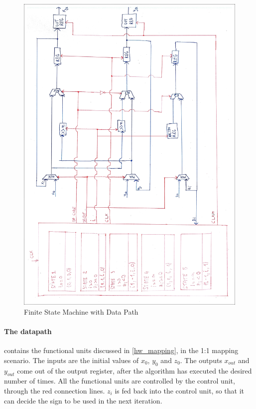 \documentclass[12pt, a4paper,oneside]{article}
\begin{document}
\begin{figure}[H]
	\centering
	\includegraphics[width = \linewidth]{finite_state_machine_edit.jpg}
	\caption{Finite State Machine with Data Path}
	\label{fig:finite_state_machine}
\end{figure}

\paragraph{The datapath}
contains the functional units discussed in \ref{hw_mapping}, in the 1:1 mapping
scenario. The inputs are the initial values of $x_0$, $y_0$ and $z_0$. The outputs
$x_{out}$ and $y_{out}$
come out of the output register, after the algorithm has executed the desired
number of times. All the functional units are controlled by the control unit, 
through the red connection lines. $z_i$ is fed back into the control unit, 
so that it can decide the sign to be used in the next iteration.
\end{document}
